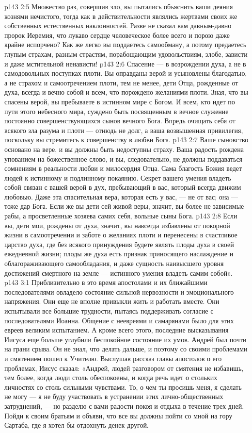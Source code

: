 \vs p143 2:5 Множество раз, совершив зло, вы пытались объяснить ваши деяния кознями нечистого, тогда как в действительности являлись жертвами своих же собственных естественных наклонностей. Разве не сказал вам давным\hyp{}давно пророк Иеремия, что лукаво сердце человеческое более всего и порою даже крайне испорчено? Как же легко вы поддаетесь самообману, а потому предаетесь глупым страхам, разным страстям, порабощающим удовольствиям, злобе, зависти и даже мстительной ненависти!
\vs p143 2:6 Спасение --- в возрождении духа, а не в самодовольных поступках плоти. Вы оправданы верой и усыновлены благодатью, а не страхом и самоотречением плоти, тем не менее, дети Отца, рожденные от духа, всегда и вечно  собой и всем, что порождено желаниями плоти. Зная, что вы спасены верой, вы пребываете в истинном мире с Богом. И всем, кто идет по пути этого небесного мира, суждено быть посвященным в вечное служение постоянно совершенствующихся сынов вечного Бога. Впредь очищать себя от всякого зла разума и плоти --- отнюдь не долг, а ваша возвышенная привилегия, поскольку вы стремитесь к совершенству в любви Бога.
\vs p143 2:7 Ваше сыновство основано на вере, и вы должны быть недоступны страху. Ваша радость рождена упованием на божественное слово, и вы, следовательно, не должны поддаваться сомнениям в реальности любви и милосердия Отца. Сама благость Божия ведет людей к истинному и подлинному покаянию. Секрет вашего умения владеть собой связан с вашей верой в дух, пребывающий в вас, который всегда движим любовью. Даже эта спасительная вера, которая есть у вас, --- не от вас; она --- тоже дар Бога. Если же вы дети сей живой веры, значит, вы более не зависимые рабы, а просветленные хозяева самих себя, вольные сыны Бога.
\vs p143 2:8 Если вы, дети мои, рождены от духа, значит, вы навсегда избавлены от покорной жизни в самоотречении и заботе о желаниях плоти и перенесены в счастливое царство духа, где без всякого принуждения будете являть плоды духа в своей ежедневной жизни; плоды же духа есть признак приносящего наслаждение и облагораживающего самообладания, и даже сущность наивысшего уровня достижений смертного на земле --- истинного умения владеть самим собой».
\vs p143 3:1 Приблизительно в это время апостолами и их ближайшими последователями овладело состояние сильной нервозности и эмоционального напряжения. Они еще не вполне привыкли жить и работать вместе. Они испытывали все большие трудности, пытаясь поддерживать согласие с последователями Иоанна. Общение с неевреями и самарянами было для этих евреев великим испытанием. А кроме всего этого, последние высказывания Иисуса еще больше углубили беспокойное состояние их умов. Андрей был почти на грани срыва. Он не знал, что делать дальше, и поэтому со своими проблемами и смятением пошел к Учителю. Выслушав рассказ главы апостолов о его проблемах, Иисус сказал: «Андрей, людей разговором от смятения не избавишь, тем более, когда люди столь обеспокоены, и когда речь идет о стольких личностях со столь сильными чувствами. То, о чем ты просишь меня, я сделать не могу --- я не буду участвовать в устранении этих лично\hyp{}общественных затруднений, --- но разделю с вами радости покоя и отдыха в течение трех дней. Пойди к своим братьям и объяви, что все вы должны пойти со мной на гору Сартаба, где я хотел бы отдохнуть денек\hyp{}другой.
